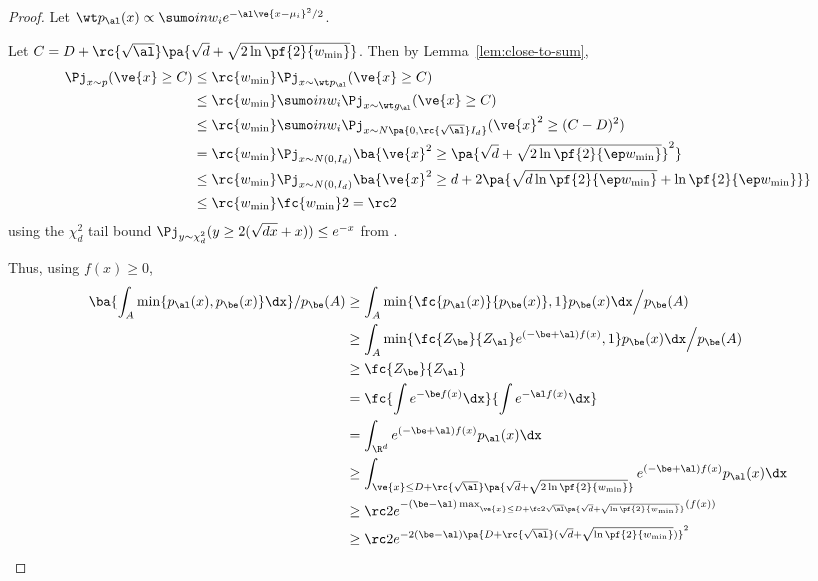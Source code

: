 \begin{proof}
Let $\wt p_\al(x) \propto \sumo in w_i e^{-\al\ve{x-\mu_i}^2/2}$. 

Let %
$C= D +\rc{\sqrt\al} \pa{\sqrt{d}+\sqrt{2\ln \pf{2}{w_{\min}}}}$. Then by Lemma~\ref{lem:close-to-sum}, 
\begin{align}
\Pj_{x\sim p} (\ve{x}\ge C) 
&\le \rc{w_{\min}} \Pj_{x\sim \wt p_{\al}}(\ve{x}\ge C)\\
&\le \rc{w_{\min}}
\sumo in w_i \Pj_{x\sim \wt g_{\al}} (\ve{x}\ge C)\\
&\le  \rc{w_{\min}}\sumo in w_i \Pj_{x\sim N\pa{0,\rc{\sqrt \al} I_d}}(\ve{x}^2 \ge (C-D)^2)\\
&= \rc{w_{\min}} \Pj_{x\sim N(0, I_d)}\ba{\ve{x}^2 \ge \pa{\sqrt{d} + \sqrt{2\ln \pf{2}{\ep w_{\min}}}}^2}\\
&\le \rc{w_{\min}} \Pj_{x\sim N(0, I_d)}\ba{\ve{x}^2 \ge 
d+2\pa{\sqrt{d \ln\pf{2}{\ep w_{\min}}} + \ln \pf{2}{\ep w_{\min}}}}
\\
&\le  \rc{w_{\min}}\fc{w_{\min}}2 =\rc2
\end{align}
using the $\chi_d^2$ tail bound $\Pj_{y\sim \chi_d^2}(y\ge 2(\sqrt{dx}+x))\le e^{-x}$ from \cite{laurent2000adaptive}.

Thus, using $f(x)\ge 0$, 
\begin{align}
\ba{
\int_{A} \min\{p_{\al}(x),p_\be(x)\} \dx 
}/p_\be(A)
&\ge \int_A \min\{\fc{p_{\al}(x)}{p_\be(x)},1\} p_\be(x)\dx\Big/p_\be(A)\\
&\ge \int_A \min\{\fc{Z_\be}{Z_\al} e^{(-\be + \al)f(x)}, 1\} p_\be(x)\dx\Big /p_\be(A)\\
&\ge \fc{Z_\be}{Z_\al}
\\
& = \fc{\int e^{-\be f(x)}\dx}{\int e^{-\al f(x)}\dx}\\
&=\int_{\R^d} e^{(-\be + \al)f(x)}p_\al(x)\dx\\
&\ge \int_{\ve{x}\le D +\rc{\sqrt\al} \pa{\sqrt{d}+\sqrt{2\ln \pf{2}{w_{\min}}}}} e^{(-\be + \al)f(x)}p_\al(x)\dx\\
&\ge \rc2 e^{-(\be-\al)\max_{\ve{x}\le D +\fc2{\sqrt\al} \pa{\sqrt{d}+\sqrt{\ln \pf{2}{w_{\min}}}}}(f(x))}\\
&\ge \rc 2 e^{-2(\be-\al)\pa{D+\rc{\sqrt \al}(\sqrt d + \sqrt{\ln \pf{2}{w_{\min}}})}^2}
\end{align}
\end{proof}

